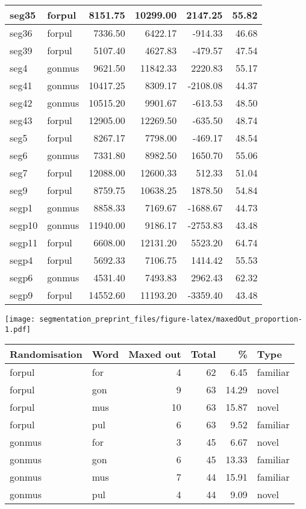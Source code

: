 \begin{appendix}
\begin{tabular}{l|l|r|r|r|r}
\hline
seg35 & forpul & 8151.75 & 10299.00 & 2147.25 & 55.82\\
\hline
seg36 & forpul & 7336.50 & 6422.17 & -914.33 & 46.68\\
\hline
seg39 & forpul & 5107.40 & 4627.83 & -479.57 & 47.54\\
\hline
seg4 & gonmus & 9621.50 & 11842.33 & 2220.83 & 55.17\\
\hline
seg41 & gonmus & 10417.25 & 8309.17 & -2108.08 & 44.37\\
\hline
seg42 & gonmus & 10515.20 & 9901.67 & -613.53 & 48.50\\
\hline
seg43 & forpul & 12905.00 & 12269.50 & -635.50 & 48.74\\
\hline
seg5 & forpul & 8267.17 & 7798.00 & -469.17 & 48.54\\
\hline
seg6 & gonmus & 7331.80 & 8982.50 & 1650.70 & 55.06\\
\hline
seg7 & forpul & 12088.00 & 12600.33 & 512.33 & 51.04\\
\hline
seg9 & forpul & 8759.75 & 10638.25 & 1878.50 & 54.84\\
\hline
segp1 & gonmus & 8858.33 & 7169.67 & -1688.67 & 44.73\\
\hline
segp10 & gonmus & 11940.00 & 9186.17 & -2753.83 & 43.48\\
\hline
segp11 & forpul & 6608.00 & 12131.20 & 5523.20 & 64.74\\
\hline
segp4 & forpul & 5692.33 & 7106.75 & 1414.42 & 55.53\\
\hline
segp6 & gonmus & 4531.40 & 7493.83 & 2962.43 & 62.32\\
\hline
segp9 & forpul & 14552.60 & 11193.20 & -3359.40 & 43.48\\
\hline
\end{tabular}

\texttt{[image: segmentation\_preprint\_files/figure-latex/maxedOut\_proportion-1.pdf]}

\begin{tabular}{l|l|r|r|r|l}
\hline
Randomisation & Word & Maxed out & Total & \% & Type\\
\hline
forpul & for & 4 & 62 & 6.45 & familiar\\
\hline
forpul & gon & 9 & 63 & 14.29 & novel\\
\hline
forpul & mus & 10 & 63 & 15.87 & novel\\
\hline
forpul & pul & 6 & 63 & 9.52 & familiar\\
\hline
gonmus & for & 3 & 45 & 6.67 & novel\\
\hline
gonmus & gon & 6 & 45 & 13.33 & familiar\\
\hline
gonmus & mus & 7 & 44 & 15.91 & familiar\\
\hline
gonmus & pul & 4 & 44 & 9.09 & novel\\
\hline
\end{tabular}


\end{appendix}

